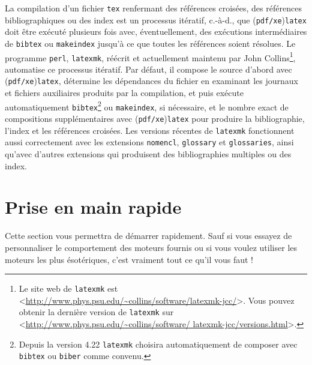 \documentclass[11pt,french]{article}
\newcommand{\TS}{\textsf{\TeX Shop}}
\newcommand{\cmd}[1]{\textsf{#1}}
\begin{document}
La compilation d'un fichier \texttt{tex} renfermant des références croisées, des références bibliographiques ou des index est un processus itératif, c.-à-d., que (\texttt{pdf/xe})\texttt{latex} doit être exécuté plusieurs fois avec, éventuellement, des exécutions intermédiaires de \texttt{bibtex} ou \texttt{makeindex} jusqu'à ce que toutes les références soient résolues. Le programme \texttt{perl}, \texttt{latexmk}, réécrit et actuellement maintenu par John Collins\footnote{Le site web de \texttt{latexmk} est <\url{http://www.phys.psu.edu/~collins/software/latexmk-jcc/}>.
Vous pouvez obtenir la dernière version de \texttt{latexmk} sur <\url{http://www.phys.psu.edu/~collins/software/
latexmk-jcc/versions.html}>.}, automatise ce processus itératif. Par défaut, il compose le source d'abord avec (\texttt{pdf/xe})\texttt{latex}, détermine les dépendances du fichier en examinant les journaux et fichiers auxiliaires produits par la compilation, et puis exécute automatiquement \texttt{bibtex}\footnote{Depuis la version 4.22 \texttt{latexmk} choisira automatiquement de composer avec \texttt{bibtex} ou \texttt{biber} comme convenu.} ou \texttt{makeindex}, si nécessaire, et le nombre exact de compositions supplémentaires avec (\texttt{pdf/xe})\texttt{latex} pour produire la bibliographie, l'index et les références croisées. Les versions récentes de \texttt{latexmk} fonctionnent aussi correctement avec les extensions \texttt{nomencl}, \texttt{glossary} et \texttt{glossaries}, ainsi qu'avec d'autres extensions qui produisent des bibliographies multiples ou des index.


%

\section{Prise en main rapide}

Cette section vous permettra de démarrer rapidement. Sauf si vous essayez de personnaliser le comportement des moteurs fournis ou si vous voulez utiliser les moteurs les plus ésotériques, c'est vraiment tout ce qu'il vous faut !

%
\end{document}
